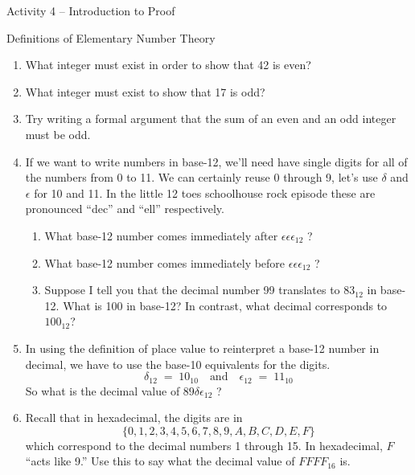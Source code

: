 \documentclass{amsart}
\begin{document}
\thispagestyle{empty}

\centerline{\Large Activity 4 -- Introduction to Proof}
\centerline{\large Definitions of Elementary Number Theory}

\bigskip
\Large


\begin{enumerate}
\item What integer must exist in order to show that 42 is even?
\vfill

\item What integer must exist to show that 17 is odd?
\vfill

\item Try writing a formal argument that the sum of an even and an odd integer must be odd.
\vfill

\item If we want to write numbers in base-12, we'll need have single digits for all of the numbers from 0 to 11.  We can certainly reuse 0 through 9, let's use $\delta$ and $\epsilon$ for 10 and 11.  In the little 12 toes schoolhouse rock episode these are pronounced ``dec'' and ``ell'' respectively.
\begin{enumerate}
\item What base-12 number comes immediately after $\epsilon \epsilon \epsilon_{12}$ ?
\vfill

\item What base-12 number comes immediately before $\epsilon \epsilon \epsilon_{12}$ ?
\vfill

\item Suppose I tell you that the decimal number 99 translates to $83_{12}$ in base-12.  What is 100 in base-12?  In contrast, what decimal corresponds to $100_{12}$?
\vfill

\end{enumerate}

\newpage

\item In using the definition of place value to reinterpret a base-12 number in decimal, we have to use the base-10 equivalents for the digits.
\[ \delta_{12} \; = \; 10_{10} \quad \mbox{and} \quad \epsilon_{12} \; = \; 11_{10} \]
So what is the decimal value of $89\delta\epsilon_{12}$ ?

\vfill

\item Recall that in hexadecimal, the digits are in 
\[ \{0,1,2,3,4,5,6,7,8,9,A,B,C,D,E,F\} \]
\noindent which correspond to the decimal numbers 1 through 15.  In hexadecimal, $F$ ``acts like 9.''  Use this to say what the decimal value of $FFFF_{16}$ is.


\end{enumerate}
\end{document}

